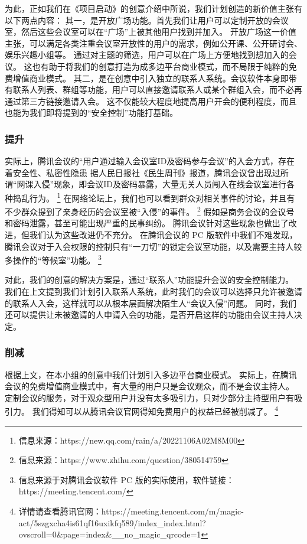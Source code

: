 \documentclass[a4paper,12pt]{article}
\begin{document}
    为此，正如我们在《项目启动》的创意介绍中所说，我们计划创造的新价值主张有以下两点内容：
    其一，是开放广场功能。首先我们让用户可以定制开放的会议室，然后这些会议室可以在“广场”上被其他用户找到并加入。
    开放广场这一价值主张，可以满足各类注重会议室开放性的用户的需求，例如公开课、公开研讨会、娱乐兴趣小组等。
    通过对主题的筛选，用户可以在广场上方便地找到想加入的会议。
    这也有助于将我们的创意打造为成多边平台商业模式，而不局限于纯粹的免费增值商业模式。
    其二，是在创意中引入独立的联系人系统。会议软件本身即带有联系人列表、群组等功能，用户可以直接邀请联系人或某个群组入会，而不必再通过第三方链接邀请入会。
    这不仅能较大程度地提高用户开会的便利程度，而且也能为我们即将提到的“安全控制”功能打基础。

    \subsubsection{提升}

    实际上，腾讯会议的“用户通过输入会议室ID及密码参与会议”的入会方式，存在着安全性、私密性隐患
    据人民日报社《民生周刊》报道，腾讯会议曾出现过所谓“网课入侵”现象，即会议ID及密码暴露，大量无关人员闯入在线会议室进行各种捣乱行为。
    \footnote{信息来源：https://new.qq.com/rain/a/20221106A02M8M00}
    在网络论坛上，我们也可以看到群众对相关事件的讨论，并且有不少群众提到了亲身经历的会议室被“入侵”的事件。
    \footnote{信息来源：https://www.zhihu.com/question/380514759}
    假如是商务会议的会议号和密码泄露，甚至可能出现严重的民事纠纷。
    腾讯会议针对这些现象也做出了改进，但我们认为这些改进仍不充分。
    在腾讯会议的 PC 版软件中我们不难发现，腾讯会议对于入会权限的控制只有“一刀切”的锁定会议室功能，以及需要主持人较多操作的“等候室”功能。
    \footnote{信息来源于对腾讯会议软件 PC 版的实际使用，软件链接：https://meeting.tencent.com/}


    对此，我们的创意的解决方案是，通过“联系人”功能提升会议的安全控制能力。
    我们在上文提到我们计划引入联系人系统，此时我们的会议可以选择只允许被邀请的联系人入会，这样就可以从根本层面解决陌生人“会议入侵”问题。
    同时，我们还可以提供让未被邀请的人申请入会的功能，是否开启这样的功能由会议主持人决定。


    \subsubsection{削减}
    根据上文，在本小组的创意中我们计划引入多边平台商业模式。
    实际上，在腾讯会议的免费增值商业模式中，有大量的用户只是会议观众，而不是会议主持人。
    定制会议的服务，对于观众型用户并没有太多吸引力，只对少部分主持型用户有吸引力。
    我们得知可以从腾讯会议官网得知免费用户的权益已经被削减了。
    \footnote{详情请查看腾讯官网：https://meeting.tencent.com/m/magic-act/5szgxcha4is61qf16uxikfq589/index\_index.html?ovscroll=0\&page=index\&\_\_no\_magic\_qrcode=1}
\end{document}
